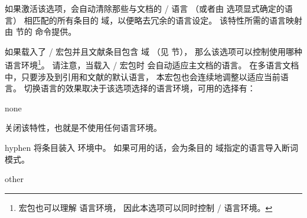 \begin{optionlist}
如果激活该选项，\biblatex 会自动清除那些与文档的 / 语言
（或者由  选项显式确定的语言）
相匹配的所有条目的  域，以便略去冗余的语言设定。
该特性所需的语言映射由  节的  命令提供。



如果载入了 / 宏包并且文献条目包含  域
（见  节），
那么该选项可以控制使用哪种  语言环境\footnote{
	 宏包也可以理解  语言环境，
	因此本选项可以同时控制 / 语言环境。}。
请注意，当载入 / 宏包时 \biblatex 会自动适应主文档的语言。
在多语言文档中，只要涉及到引用和文献的默认语言，
本宏包也会连续地调整以适应当前语言。
切换语言的效果取决于该选项选择的语言环境，可用的选择有：

\begin{valuelist}

\item[none]

关闭该特性，也就是不使用任何语言环境。

\item[hyphen]
将条目装入   环境中。
如果可用的话，会为条目的  域指定的语言导入断词模式。

\item[other]


\end{valuelist}
\end{optionlist}
